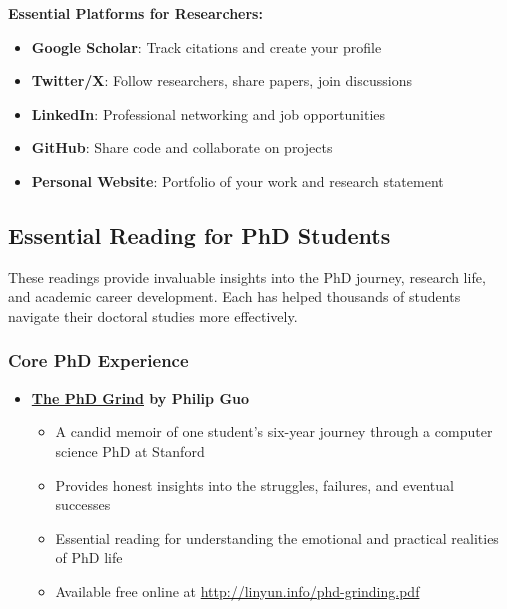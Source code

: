 \documentclass[11pt,a4paper]{article}
\begin{document}
\textbf{Essential Platforms for Researchers:}
\begin{itemize}
    \item \textbf{Google Scholar}: Track citations and create your profile
    \item \textbf{Twitter/X}: Follow researchers, share papers, join discussions
    \item \textbf{LinkedIn}: Professional networking and job opportunities
    \item \textbf{GitHub}: Share code and collaborate on projects
    \item \textbf{Personal Website}: Portfolio of your work and research statement
\end{itemize}

\subsection{Essential Reading for PhD Students}

\begin{tcolorbox}[colback=blue!5,colframe=darkblue,title=Must-Read Books and Articles]
These readings provide invaluable insights into the PhD journey, research life, and academic career development. Each has helped thousands of students navigate their doctoral studies more effectively.
\end{tcolorbox}

\subsubsection{Core PhD Experience}

\begin{itemize}
    \item \textbf{\href{http://linyun.info/phd-grinding.pdf}{The PhD Grind} by Philip Guo}
    \begin{itemize}
        \item A candid memoir of one student's six-year journey through a computer science PhD at Stanford
        \item Provides honest insights into the struggles, failures, and eventual successes
        \item Essential reading for understanding the emotional and practical realities of PhD life
        \item Available free online at \url{http://linyun.info/phd-grinding.pdf}
    \end{itemize}
    
\end{itemize}
\end{document}
